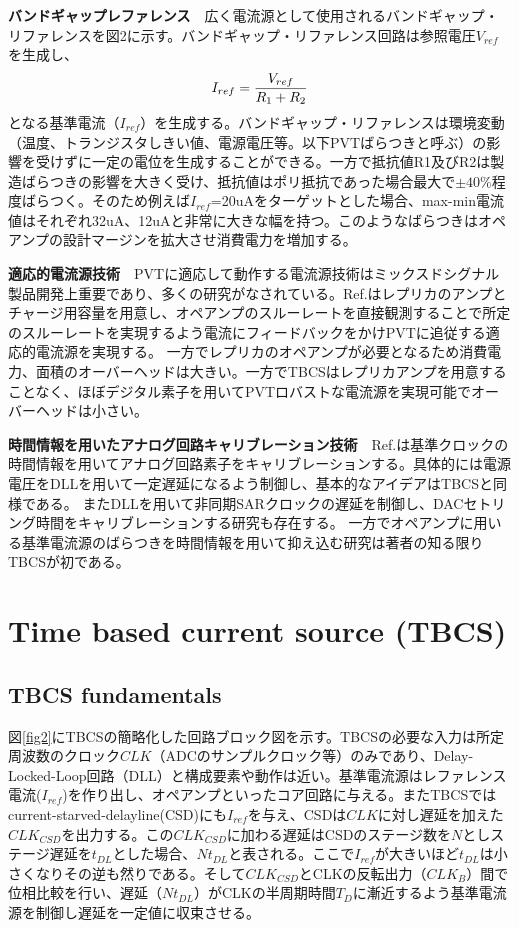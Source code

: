 \documentclass[letterpaper, 10 pt, conference]{ieeeconf}  %
\begin{document}
\textbf{バンドギャップレファレンス}　広く電流源として使用されるバンドギャップ・リファレンスを図2に示す。バンドギャップ・リファレンス回路は参照電圧$V_{ref}$を生成し、
\begin{eqnarray}
    \centering
    I_{ref} = \frac{V_{ref}}{R_1 + R_2}
    \label{sar13b}
\end{eqnarray}
となる基準電流（$I_{ref}$）を生成する。バンドギャップ・リファレンスは環境変動（温度、トランジスタしきい値、電源電圧等。以下PVTばらつきと呼ぶ）の影響を受けずに一定の電位を生成することができる。一方で抵抗値R1及びR2は製造ばらつきの影響を大きく受け、抵抗値はポリ抵抗であった場合最大で$\pm 40\%$程度ばらつく。そのため例えば$I_{ref}$=20uAをターゲットとした場合、max-min電流値はそれぞれ32uA、12uAと非常に大きな幅を持つ。このようなばらつきはオペアンプの設計マージンを拡大させ消費電力を増加する。

\textbf{適応的電流源技術}　PVTに適応して動作する電流源技術はミックスドシグナル製品開発上重要であり、多くの研究がなされている。Ref.\cite{chuanyang,ron}はレプリカのアンプとチャージ用容量を用意し、オペアンプのスルーレートを直接観測することで所定のスルーレートを実現するよう電流にフィードバックをかけPVTに追従する適応的電流源を実現する。
一方でレプリカのオペアンプが必要となるため消費電力、面積のオーバーヘッドは大きい。一方でTBCSはレプリカアンプを用意することなく、ほぼデジタル素子を用いてPVTロバストな電流源を実現可能でオーバーヘッドは小さい。

\textbf{時間情報を用いたアナログ回路キャリブレーション技術}　Ref.\cite{zhu}は基準クロックの時間情報を用いてアナログ回路素子をキャリブレーションする。具体的には電源電圧をDLLを用いて一定遅延になるよう制御し、基本的なアイデアはTBCSと同様である。
またDLLを用いて非同期SARクロックの遅延を制御し、DACセトリング時間をキャリブレーションする研究も存在する\cite{kapusta201314b,tompson}。
一方でオペアンプに用いる基準電流源のばらつきを時間情報を用いて抑え込む研究は著者の知る限りTBCSが初である。

\section{Time based current source (TBCS)}
\subsection{TBCS fundamentals}

図\ref{fig2}にTBCSの簡略化した回路ブロック図を示す。TBCSの必要な入力は所定周波数のクロック$CLK$（ADCのサンプルクロック等）のみであり、Delay-Locked-Loop回路（DLL）と構成要素や動作は近い\cite{sidiropoulos1997semidigital, lee19942, razavi2018delay}。基準電流源はレファレンス電流($I_{ref}$)を作り出し、オペアンプといったコア回路に与える。またTBCSではcurrent-starved-delayline(CSD)にも$I_{ref}$を与え、CSDは$CLK$に対し遅延を加えた$CLK_{CSD}$を出力する。この$CLK_{CSD}$に加わる遅延はCSDのステージ数を$N$としステージ遅延を$t_{DL}$とした場合、$Nt_{DL}$と表される。ここで$I_{ref}$が大きいほど$t_{DL}$は小さくなりその逆も然りである。そして$CLK_{CSD}$とCLKの反転出力（$CLK_B$）間で位相比較を行い、遅延（$Nt_{DL}$）がCLKの半周期時間$T_D$に漸近するよう基準電流源を制御し遅延を一定値に収束させる。
\end{document}
